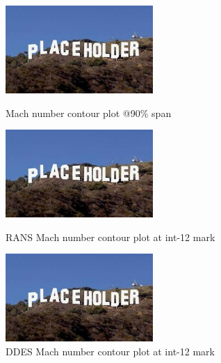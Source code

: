 \begin{figure}[ht]
  \centering
  \includegraphics[width=0.5\textwidth]{Pictures/placeholder.jpg}
  \caption{Mach number contour plot @90\% span \citep{r67laser}} \label{90-mach-exp}
  
  \vspace*{\floatsep}%

  \includegraphics[width=0.5\textwidth]{Pictures/placeholder.jpg}
  \caption{RANS Mach number contour plot at int-12 mark} \label{int-12-rans-mach}
  
   \vspace*{\floatsep}%
   
  \includegraphics[width=0.5\textwidth]{Pictures/placeholder.jpg}
  \caption{DDES Mach number contour plot at int-12 mark} \label{int-12-ddes-mach}
\end{figure}